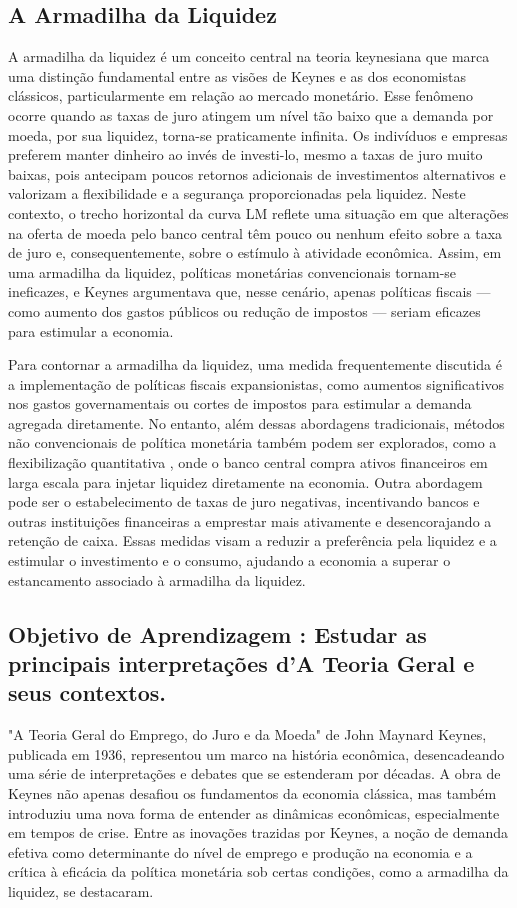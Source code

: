\documentclass[a4paper,12pt]{article}[abntex2]
\begin{document}
\subsection{\textbf{A Armadilha da Liquidez}}
A armadilha da liquidez é um conceito central na teoria keynesiana que marca uma distinção fundamental entre as visões de Keynes e as dos economistas clássicos, particularmente em relação ao mercado monetário. Esse fenômeno ocorre quando as taxas de juro atingem um nível tão baixo que a demanda por moeda, por sua liquidez, torna-se praticamente infinita. Os indivíduos e empresas preferem manter dinheiro ao invés de investi-lo, mesmo a taxas de juro muito baixas, pois antecipam poucos retornos adicionais de investimentos alternativos e valorizam a flexibilidade e a segurança proporcionadas pela liquidez. Neste contexto, o trecho horizontal da curva LM reflete uma situação em que alterações na oferta de moeda pelo banco central têm pouco ou nenhum efeito sobre a taxa de juro e, consequentemente, sobre o estímulo à atividade econômica. Assim, em uma armadilha da liquidez, políticas monetárias convencionais tornam-se ineficazes, e Keynes argumentava que, nesse cenário, apenas políticas fiscais — como aumento dos gastos públicos ou redução de impostos — seriam eficazes para estimular a economia.

Para contornar a armadilha da liquidez, uma medida frequentemente discutida é a implementação de políticas fiscais expansionistas, como aumentos significativos nos gastos governamentais ou cortes de impostos para estimular a demanda agregada diretamente. No entanto, além dessas abordagens tradicionais, métodos não convencionais de política monetária também podem ser explorados, como a flexibilização quantitativa , onde o banco central compra ativos financeiros em larga escala para injetar liquidez diretamente na economia. Outra abordagem pode ser o estabelecimento de taxas de juro negativas, incentivando bancos e outras instituições financeiras a emprestar mais ativamente e desencorajando a retenção de caixa. Essas medidas visam a reduzir a preferência pela liquidez e a estimular o investimento e o consumo, ajudando a economia a superar o estancamento associado à armadilha da liquidez.

\subsection{\textbf{Objetivo de Aprendizagem : Estudar as principais interpretações d’A Teoria Geral e seus contextos.}}
"A Teoria Geral do Emprego, do Juro e da Moeda" de John Maynard Keynes, publicada em 1936, representou um marco na história econômica, desencadeando uma série de interpretações e debates que se estenderam por décadas. A obra de Keynes não apenas desafiou os fundamentos da economia clássica, mas também introduziu uma nova forma de entender as dinâmicas econômicas, especialmente em tempos de crise. Entre as inovações trazidas por Keynes, a noção de demanda efetiva como determinante do nível de emprego e produção na economia e a crítica à eficácia da política monetária sob certas condições, como a armadilha da liquidez, se destacaram.
\end{document}
